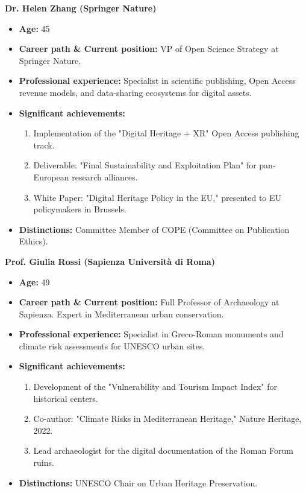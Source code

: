 \textbf{Dr. Helen Zhang (Springer Nature)}
\begin{itemize}
  \item \textbf{Age:} 45
  \item \textbf{Career path \& Current position:} VP of Open Science Strategy at Springer Nature.
  \item \textbf{Professional experience:} Specialist in scientific publishing, Open Access revenue models, and data-sharing ecosystems for digital assets.
  \item \textbf{Significant achievements:}
    \begin{enumerate}
      \item Implementation of the "Digital Heritage + XR" Open Access publishing track.
      \item Deliverable: "Final Sustainability and Exploitation Plan" for pan-European research alliances.
      \item White Paper: "Digital Heritage Policy in the EU," presented to EU policymakers in Brussels.
    \end{enumerate}
  \item \textbf{Distinctions:} Committee Member of COPE (Committee on Publication Ethics).
\end{itemize}

\textbf{Prof. Giulia Rossi (Sapienza Università di Roma)}
\begin{itemize}
  \item \textbf{Age:} 49
  \item \textbf{Career path \& Current position:} Full Professor of Archaeology at Sapienza. Expert in Mediterranean urban conservation.
  \item \textbf{Professional experience:} Specialist in Greco-Roman monuments and climate risk assessments for UNESCO urban sites.
  \item \textbf{Significant achievements:}
    \begin{enumerate}
      \item Development of the "Vulnerability and Tourism Impact Index" for historical centers.
      \item Co-author: "Climate Risks in Mediterranean Heritage," Nature Heritage, 2022.
      \item Lead archaeologist for the digital documentation of the Roman Forum ruins.
    \end{enumerate}
  \item \textbf{Distinctions:} UNESCO Chair on Urban Heritage Preservation.
\end{itemize}

